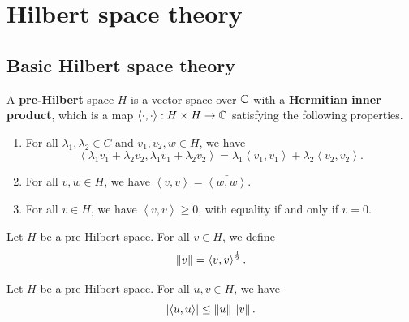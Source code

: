 \documentclass[a4paper]{article}
\renewcommand{\braket}[2]{\left\langle #1, #1 \right\rangle}
\begin{document}
\section{Hilbert space theory}

\subsection{Basic Hilbert space theory}

\begin{defi}
  A \textbf{pre-Hilbert} space $H$ is a vector space over
  $\mathbb{C}$ with a \textbf{Hermitian inner product}, which is a
  map $\braket{\cdot}{\cdot} : H \times H \to \C$ satisfying
  the following properties.

  \begin{enumerate}
    \item For all $\lambda_1, \lambda_2 \in C$ and
          $v_1, v_2, w \in H$, we have
          \[
            \braket{\lambda_1 v_1 + \lambda_2 v_2}{w}
            = \lambda_1 \braket{v_1}{2} + \lambda_2 \braket{v_2}{w}.
          \]

    \item For all $v, w \in H$, we have $\braket{v}{w}
            = \bar{\braket{w}{v}}$.

    \item For all $v \in H$, we have $\braket{v}{v} \geq 0$,
          with equality if and only if $v = 0$.
  \end{enumerate}
\end{defi}

\begin{defi}
  Let $H$ be a pre-Hilbert space. For all $v \in H$, we
  define
  \[
    \norm{v} = \braket{v}{v}^{\frac{1}{2}}.
  \]
\end{defi}

\begin{thm}
  Let $H$ be a pre-Hilbert space. For all $u, v \in H$, we
  have
  \[
    \abs{\braket{u}{v}} \leq \norm{u} \norm{v}.
  \]
\end{thm}
\end{document}
